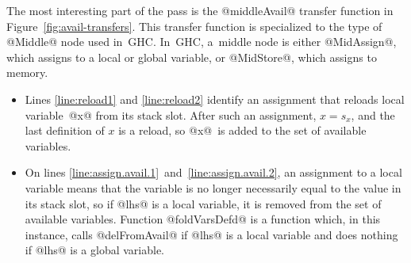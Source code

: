 \documentclass[blockstyle,preprint,natbib,nocopyrightspace]{sigplanconf}
\newcommand\linepairref[2]{lines \ref{line:#1}~and~\ref{line:#2}}
\newcommand\slotof[1]{\ensuremath{s_{#1}}}
\def\finalremark#1{\relax}
\newcommand\figref[1]{Figure~\ref{fig:#1}}
\begin{document}
The most interesting part of the pass is the @middleAvail@ transfer
function in \figref{avail-transfers}.\finalremark
{Let us revise the paper to pretend that global variables
don't exist.}
This transfer function is specialized to the type of @Middle@ node
used in~GHC.
In~GHC, a~middle node is either @MidAssign@, which assigns to a local
or global variable, or @MidStore@, which assigns to memory.
\begin{itemize}
\item
Lines \ref{line:reload1} and \ref{line:reload2}
identify an assignment that reloads local
variable~@x@ from its stack slot.\finalremark{I propose the compiler be
modified to use @isStackSlotOf@ as I've written. JD~approves.}
After such an assignment, $x = \slotof x$,
and the last definition of $x$ is a reload,
so @x@~is added to the set of available variables.
\item
On \linepairref{assign.avail.1}{assign.avail.2},
an assignment to a local variable means that the
variable is no longer necessarily equal to the value in its stack
slot, so if @lhs@ is a local variable, it is removed from the set of
available variables.
Function @foldVarsDefd@ is a function which, in this
instance, calls @delFromAvail@ if @lhs@ is a local variable and does
nothing if @lhs@ is a global variable.



\end{itemize}
\end{document}
